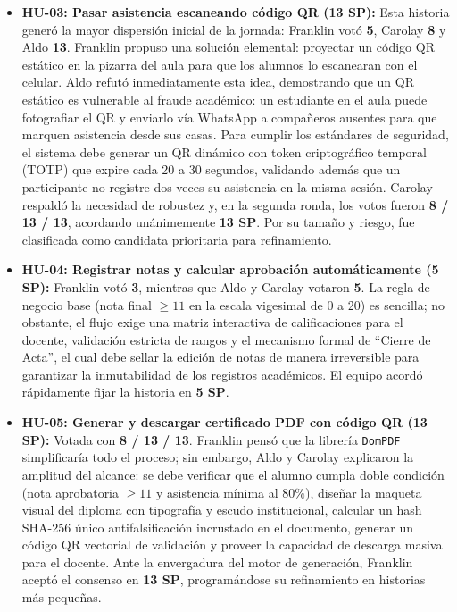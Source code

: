 \begin{itemize}
    \item \textbf{HU-03: Pasar asistencia escaneando código QR (13 SP):} Esta historia generó la mayor dispersión inicial de la jornada: Franklin votó \textbf{5}, Carolay \textbf{8} y Aldo \textbf{13}. Franklin propuso una solución elemental: proyectar un código QR estático en la pizarra del aula para que los alumnos lo escanearan con el celular. Aldo refutó inmediatamente esta idea, demostrando que un QR estático es vulnerable al fraude académico: un estudiante en el aula puede fotografiar el QR y enviarlo vía WhatsApp a compañeros ausentes para que marquen asistencia desde sus casas. Para cumplir los estándares de seguridad, el sistema debe generar un QR dinámico con token criptográfico temporal (TOTP) que expire cada 20 a 30 segundos, validando además que un participante no registre dos veces su asistencia en la misma sesión. Carolay respaldó la necesidad de robustez y, en la segunda ronda, los votos fueron \textbf{8 / 13 / 13}, acordando unánimemente \textbf{13 SP}. Por su tamaño y riesgo, fue clasificada como candidata prioritaria para refinamiento.
    
    \item \textbf{HU-04: Registrar notas y calcular aprobación automáticamente (5 SP):} Franklin votó \textbf{3}, mientras que Aldo y Carolay votaron \textbf{5}. La regla de negocio base (nota final $\ge 11$ en la escala vigesimal de 0 a 20) es sencilla; no obstante, el flujo exige una matriz interactiva de calificaciones para el docente, validación estricta de rangos y el mecanismo formal de \enquote{Cierre de Acta}, el cual debe sellar la edición de notas de manera irreversible para garantizar la inmutabilidad de los registros académicos. El equipo acordó rápidamente fijar la historia en \textbf{5 SP}.
    
    \item \textbf{HU-05: Generar y descargar certificado PDF con código QR (13 SP):} Votada con \textbf{8 / 13 / 13}. Franklin pensó que la librería \texttt{DomPDF} simplificaría todo el proceso; sin embargo, Aldo y Carolay explicaron la amplitud del alcance: se debe verificar que el alumno cumpla doble condición (nota aprobatoria $\ge 11$ y asistencia mínima al $80\%$), diseñar la maqueta visual del diploma con tipografía y escudo institucional, calcular un hash SHA-256 único antifalsificación incrustado en el documento, generar un código QR vectorial de validación y proveer la capacidad de descarga masiva para el docente. Ante la envergadura del motor de generación, Franklin aceptó el consenso en \textbf{13 SP}, programándose su refinamiento en historias más pequeñas.
    

\end{itemize}
